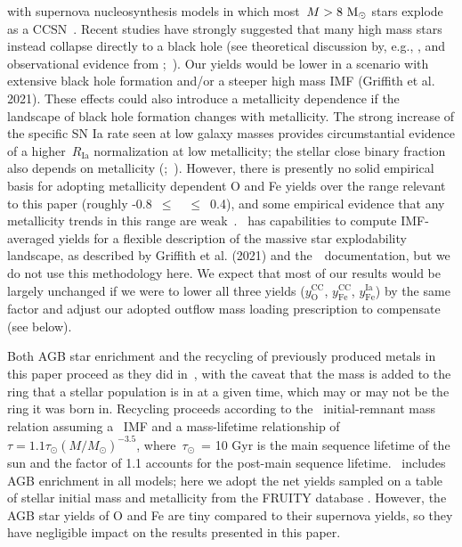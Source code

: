 \documentclass[draft2.tex]{subfiles}
\begin{document}
with supernova nucleosynthesis models in which most~$M > 8~\text{M}_\odot$ stars explode 
as a CCSN~\citep[e.g.][]{Chieffi2004, Chieffi2013}. 
Recent studies have strongly suggested that many high mass stars instead 
collapse directly to a black hole (see theoretical discussion by, e.g., 
\citealp{Pejcha2015, Sukhbold2016, Ertl2016}, and observational evidence from 
\citealp*{Gerke2015};~\citealp{Adams2017, Basinger2020}). 
Our yields would be lower in a scenario with extensive black hole formation 
and/or a steeper high mass IMF (Griffith et al. 2021). 
These effects could also introduce a metallicity dependence if the landscape of 
black hole formation changes with metallicity. 
The strong increase of the specific SN Ia rate seen at low galaxy masses 
\citep{Brown2019} provides circumstantial evidence of a higher~$R_\text{Ia}$ 
normalization at low metallicity; the stellar close binary fraction also 
depends on metallicity (\citealp{Badenes2018};~\citealp*{Moe2019}). 
However, there is presently no solid empirical basis for adopting metallicity 
dependent O and Fe yields over the range relevant to this paper (roughly 
-0.8~$\leq$~\feh~$\leq$~0.4), and some empirical evidence that any metallicity 
trends in this range are weak~\citep{Weinberg2019}. 
\vice~has capabilities to compute IMF-averaged yields for a flexible 
description of the massive star explodability landscape, as described by 
Griffith et al. (2021) and the~\vice~documentation, but we do not use this 
methodology here. 
We expect that most of our results would be largely unchanged if we were to 
lower all three yields ($y_\text{O}^\text{CC}$, $y_\text{Fe}^\text{CC}$, 
$y_\text{Fe}^\text{Ia}$) by the same factor and adjust our adopted outflow 
mass loading prescription to compensate (see below). 
\par 
Both AGB star enrichment and the recycling of previously produced metals in 
this paper proceed as they did in~\citet{Johnson2020}, with the caveat that the 
mass is added to the ring that a stellar population is in at a given time, 
which may or may not be the ring it was born in. 
Recycling proceeds according to the~\citet{Kalirai2008} initial-remnant mass 
relation assuming a~\citet{Kroupa2001} IMF and a mass-lifetime relationship of 
$\tau = 1.1\tau_\odot(M/M_\odot)^{-3.5}$, where~$\tau_\odot$~= 10 Gyr is the 
main sequence lifetime of the sun and the factor of 1.1 accounts for the 
post-main sequence lifetime. 
\vice~includes AGB enrichment in all models; here we adopt the net yields 
sampled on a table of stellar initial mass and metallicity from the FRUITY 
database \citep{Cristallo2011}. 
However, the AGB star yields of O and Fe are tiny compared to their 
supernova yields, so they have negligible impact on the results presented in 
this paper. 
\end{document}

